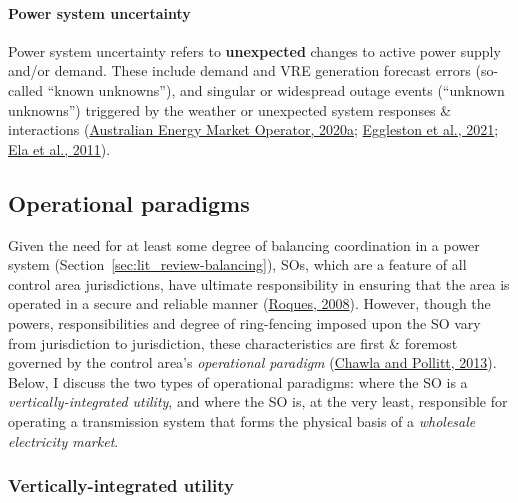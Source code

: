 \documentclass[12pt,a4paper,]{report}
\begin{document}
\hypertarget{power-system-uncertainty}{%
\paragraph{Power system uncertainty}\label{power-system-uncertainty}}

Power system uncertainty refers to \textbf{unexpected} changes to active
power supply and/or demand. These include demand and VRE generation
forecast errors (so-called ``known unknowns''), and singular or
widespread outage events (``unknown unknowns'') triggered by the weather
or unexpected system responses \& interactions
(\protect\hyperlink{ref-australianenergymarketoperatorRenewableIntegrationStudy2020}{Australian
Energy Market Operator, 2020a};
\protect\hyperlink{ref-egglestonSecurityResilienceTechnical2021}{Eggleston
et al., 2021};
\protect\hyperlink{ref-elaOperatingReservesVariable2011}{Ela et al.,
2011}).

\hypertarget{sec:lit_review-operational_paradigms}{%
\subsection{Operational
paradigms}\label{sec:lit_review-operational_paradigms}}

Given the need for at least some degree of balancing coordination in a
power system (Section~\ref{sec:lit_review-balancing}), SOs, which are a
feature of all control area jurisdictions, have ultimate responsibility
in ensuring that the area is operated in a secure and reliable manner
(\protect\hyperlink{ref-roquesMarketDesignGeneration2008}{Roques,
2008}). However, though the powers, responsibilities and degree of
ring-fencing imposed upon the SO vary from jurisdiction to jurisdiction,
these characteristics are first \& foremost governed by the control
area's \emph{operational paradigm}
(\protect\hyperlink{ref-chawlaGlobalTrendsElectricity2013}{Chawla and
Pollitt, 2013}). Below, I discuss the two types of operational
paradigms: where the SO is a \emph{vertically-integrated utility}, and
where the SO is, at the very least, responsible for operating a
transmission system that forms the physical basis of a \emph{wholesale
electricity market}.

\hypertarget{vertically-integrated-utility}{%
\subsubsection{Vertically-integrated
utility}\label{vertically-integrated-utility}}
\end{document}

